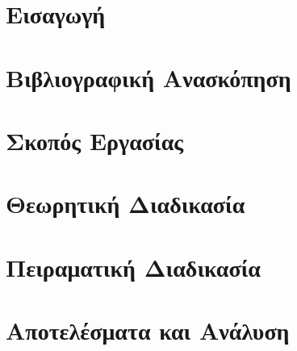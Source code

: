 \documentclass[11pt]{report}
\begin{document}



\setcounter{page}{0}



\tableofcontents
\newpage\phantom{~}\newpage



\setcounter{page}{0}    %

\chapter{Εισαγωγή}


\chapter{Βιβλιογραφική Ανασκόπηση}


\chapter{Σκοπός Εργασίας}


\chapter{Θεωρητική Διαδικασία}


\chapter{Πειραματική Διαδικασία}


\chapter{Αποτελέσματα και Ανάλυση}

\end{document}
